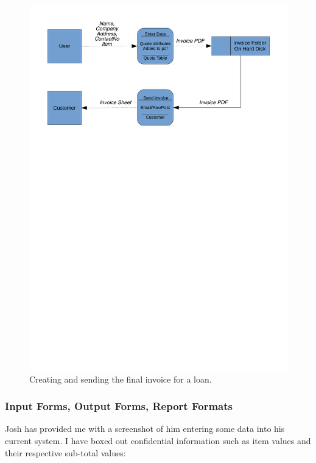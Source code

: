 \begin{center}
    \begin{figure}[H]
        \centerline{\includegraphics[width=\textwidth]{./Analysis/Dataflow/Old_System/Old_Sys_Data_flow_invoice.pdf}}
        \caption{Creating and sending the final invoice for a loan.} \label{fig:print_function_result}
    \end{figure}
\end{center}



\subsubsection{Input Forms, Output Forms, Report Formats}

Josh has provided me with a screenshot of him entering some data into his current system. I have boxed out confidential information such as item values and their respective sub-total values:\\

